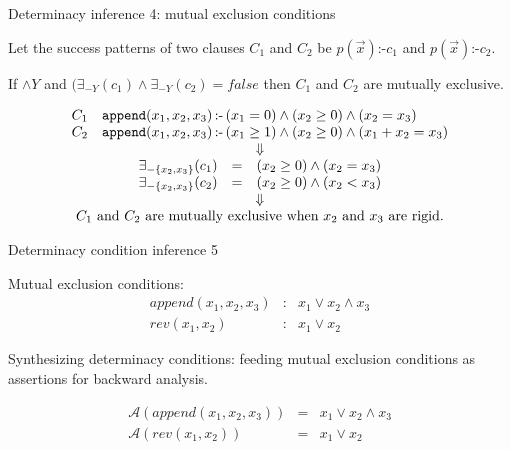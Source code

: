 \documentclass{beamer}
\def\neck           {{\, \mbox{:-} \,}}
\begin{document}
\begin{frame}{Determinacy inference 4: mutual exclusion conditions}
\vspace{\fill}

Let the success patterns of two clauses $C_1$ and $C_2$ be
\(p(\vec{x}) \mbox{:-} c_1\) and \(p(\vec{x}) \mbox{:-} c_2\).

If $\wedge Y$ and  \((\exists_{-Y}(c_1) \wedge \exists_{-Y}(c_2) =
false \) then $C_1$ and $C_2$ are mutually exclusive.

\[
\begin{array}{c}
\begin{array}{@{}l@{\quad}l@{}}
C_1 & \mathtt{append}(x_1, x_2, x_3)\neck (x_1 = 0) \wedge (x_2\geq 0) \wedge (x_2 = x_3)\\
C_2 & \mathtt{append}(x_1, x_2, x_3)\neck (x_1 \geq 1) \wedge (x_2
\geq 0) \wedge (x_1 + x_2 = x_3)
\end{array} \\
\Downarrow \\
  \begin{array}{rcl}
  \exists_{-\{x_2,x_3\}}(c_1) &=& (x_2\geq 0)\wedge (x_2 = x_3) \\
\exists_{-\{x_2,x_3\}}(c_2) &=& (x_2\geq 0)\wedge (x_2 < x_3)
\end{array}\\
\Downarrow\\

\mbox{$C_1$ and $C_2$ are mutually exclusive when $x_2$ and $x_3$
are rigid.}



\end{array}
\]


\vspace{\fill}
\end{frame}

\begin{frame}{Determinacy condition inference 5}
\vspace{\fill}


Mutual exclusion conditions:
\begin{eqnarray*}
  append(x_1,x_2,x_3) &:& x_1\vee x_2\wedge x_3 \\
  rev(x_1,x_2) &:& x_1 \vee x_2
\end{eqnarray*}

Synthesizing determinacy conditions: feeding mutual exclusion
conditions as assertions for backward analysis.

\begin{eqnarray*}
  \mathcal{A}(append(x_1,x_2,x_3)) &=& x_1\vee x_2\wedge x_3 \\
  \mathcal{A}(rev(x_1,x_2)) &=& x_1 \vee x_2
\end{eqnarray*}

\vspace{\fill}
\end{frame}
\end{document}
